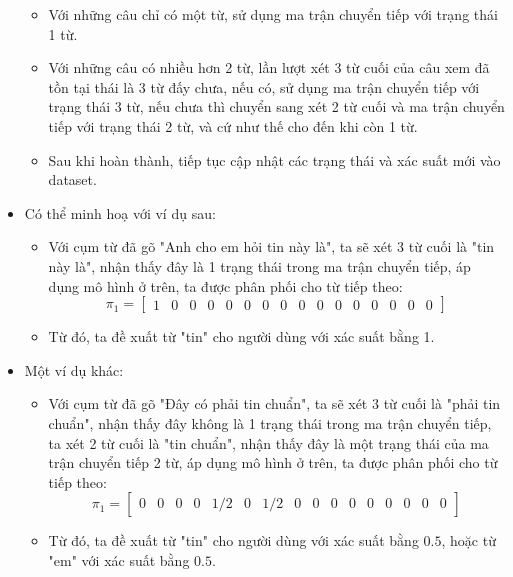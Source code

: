 \begin{itemize}
    \begin{itemize}
        \item Với những câu chỉ có một từ, sử dụng ma trận chuyển tiếp với trạng thái 1 từ.
        \item  Với những câu có nhiều hơn 2 từ, lần lượt xét 3 từ cuối của câu xem đã tồn tại thái là 3 từ đấy chưa, nếu có, sử dụng ma trận chuyển tiếp với trạng thái 3 từ, nếu chưa thì chuyển sang xét 2 từ cuối và ma trận chuyển tiếp với trạng thái 2 từ, và cứ như thế cho đến khi còn 1 từ.
        \item Sau khi hoàn thành, tiếp tục cập nhật các trạng thái và xác suất mới vào dataset.
    \end{itemize}
    \item Có thể minh hoạ với ví dụ sau:
    \begin{itemize}
        \item Với cụm từ đã gõ "Anh cho em hỏi tin này là", ta sẽ xét 3 từ cuối là "tin này là", nhận thấy đây là 1 trạng thái trong ma trận chuyển tiếp, áp dụng mô hình ở trên, ta được phân phối cho từ tiếp theo:
        $$ \pi_1 = 
        \begin{bmatrix}
            1 & 0 & 0 & 0 & 0 & 0 & 0 & 0 & 0 & 0 & 0 & 0 & 0 & 0 & 0 & 0 
        \end{bmatrix}
        $$
        \item Từ đó, ta đề xuất từ "tin" \space cho người dùng với xác suất bằng 1.        
    \end{itemize}

    \item Một ví dụ khác:
    \begin{itemize}
        \item Với cụm từ đã gõ "Đây có phải tin chuẩn", ta sẽ xét 3 từ cuối là "phải tin chuẩn", nhận thấy đây không là 1 trạng thái trong ma trận chuyển tiếp, ta xét 2 từ cuối là "tin chuẩn", nhận thấy đây là một trạng thái của ma trận chuyển tiếp 2 từ, áp dụng mô hình ở trên, ta được phân phối cho từ tiếp theo:
        $$ \pi_1 = 
        \begin{bmatrix}
            0 & 0 & 0 & 0 & 1/2 & 0 & 1/2 & 0 & 0 & 0 & 0 & 0 & 0 & 0 & 0 & 0 
        \end{bmatrix}
        $$
        \item Từ đó, ta đề xuất từ "tin" \space cho người dùng với xác suất bằng $0.5$, hoặc từ "em" \space với xác suất bằng $0.5$.        
    \end{itemize}
    
\end{itemize}


